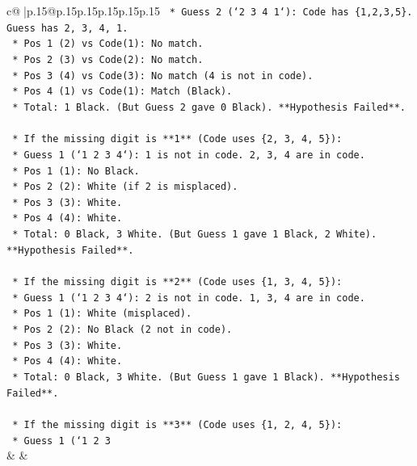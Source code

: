 \documentclass{article}
\begin{document}
{\begin{supertabular}{c@{$\;$}|p{.15\linewidth}@{}p{.15\linewidth}p{.15\linewidth}p{.15\linewidth}p{.15\linewidth}p{.15\linewidth}}
{{{\texttt{        *   Guess 2 (`2 3 4 1`): Code has \{1,2,3,5\}. Guess has 2, 3, 4, 1.} \\
\texttt{            *   Pos 1 (2) vs Code(1): No match.} \\
\texttt{            *   Pos 2 (3) vs Code(2): No match.} \\
\texttt{            *   Pos 3 (4) vs Code(3): No match (4 is not in code).} \\
\texttt{            *   Pos 4 (1) vs Code(1): Match (Black).} \\
\texttt{            *   Total: 1 Black. (But Guess 2 gave 0 Black). **Hypothesis Failed**.} \\
\\ 
\texttt{    *   If the missing digit is **1** (Code uses \{2, 3, 4, 5\}):} \\
\texttt{        *   Guess 1 (`1 2 3 4`): 1 is not in code. 2, 3, 4 are in code.} \\
\texttt{            *   Pos 1 (1): No Black.} \\
\texttt{            *   Pos 2 (2): White (if 2 is misplaced).} \\
\texttt{            *   Pos 3 (3): White.} \\
\texttt{            *   Pos 4 (4): White.} \\
\texttt{            *   Total: 0 Black, 3 White. (But Guess 1 gave 1 Black, 2 White). **Hypothesis Failed**.} \\
\\ 
\texttt{    *   If the missing digit is **2** (Code uses \{1, 3, 4, 5\}):} \\
\texttt{        *   Guess 1 (`1 2 3 4`): 2 is not in code. 1, 3, 4 are in code.} \\
\texttt{            *   Pos 1 (1): White (misplaced).} \\
\texttt{            *   Pos 2 (2): No Black (2 not in code).} \\
\texttt{            *   Pos 3 (3): White.} \\
\texttt{            *   Pos 4 (4): White.} \\
\texttt{            *   Total: 0 Black, 3 White. (But Guess 1 gave 1 Black). **Hypothesis Failed**.} \\
\\ 
\texttt{    *   If the missing digit is **3** (Code uses \{1, 2, 4, 5\}):} \\
\texttt{        *   Guess 1 (`1 2 3} \\
            }
        }
    }
    & & \\ \\


\end{supertabular}}
\end{document}
